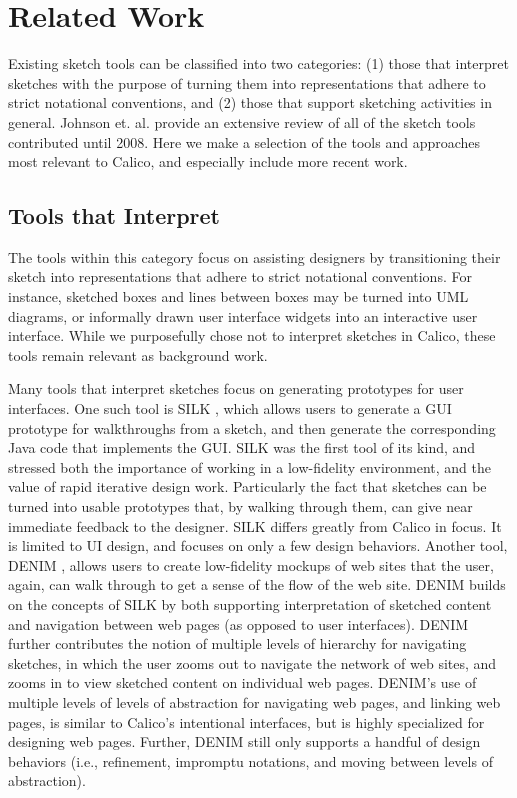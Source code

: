 \chapter{Related Work}
\label{chapter:related-work}

Existing sketch tools can be classified into two categories: (1) those that interpret sketches with the purpose of turning them into representations that adhere to strict notational conventions, and (2) those that support sketching activities in general. Johnson et. al. \cite{Johnson} provide an extensive review of all of the sketch tools contributed until 2008. Here we make a selection of the tools and approaches most relevant to Calico, and especially include more recent work.

\section{Tools that Interpret}
\label{relatedwork:1}

The  tools within this category focus on assisting designers by transitioning their sketch into representations that adhere to strict notational conventions. For instance, sketched boxes and lines between boxes may be turned into UML diagrams, or informally drawn user interface widgets into an interactive user interface. While we purposefully chose not to interpret sketches in Calico, these tools remain relevant as background work.

Many tools that interpret sketches focus on generating prototypes for user interfaces. One such tool is SILK \citep{Landay}, which allows users to generate a GUI prototype for walkthroughs from a sketch, and then generate the corresponding Java code that implements the GUI. SILK was the first tool of its kind, and stressed both the importance of working in a low-fidelity environment, and the value of rapid iterative design work. Particularly the fact that sketches can be turned into usable prototypes that, by walking through them, can give near immediate feedback to the designer. SILK differs greatly from Calico in focus. It is limited to UI design, and focuses on only a few design behaviors. Another tool, DENIM \citep{newman2003denim}, allows users to create low-fidelity mockups of web sites that the user, again, can walk through to get a sense of the flow of the web site. DENIM builds on the concepts of SILK by both supporting interpretation of sketched content and navigation between web pages (as opposed to user interfaces). DENIM further contributes the notion of multiple levels of hierarchy for navigating sketches, in which the user zooms out to navigate the network of web sites, and zooms in to view sketched content on individual web pages. DENIM's use of multiple levels of levels of abstraction for navigating web pages, and linking web pages, is similar to Calico's intentional interfaces, but is highly specialized for designing web pages. Further, DENIM still only supports a handful of design behaviors (i.e., refinement, impromptu notations, and moving between levels of abstraction).

